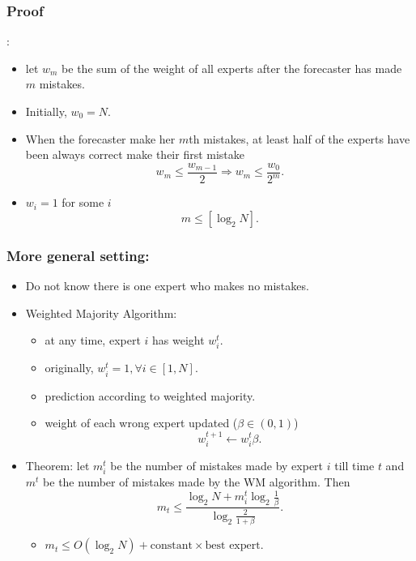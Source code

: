 \documentclass{beamer}
\begin{document}
\begin{frame}
\frametitle{Proof}:
\begin{itemize}
\item let $w_m$ be the sum of the weight of all experts after the forecaster has made $m$ mistakes.
\pause
\item Initially, $w_0 = N.$
\pause
\item When the forecaster make her $m$th mistakes, at least half of the experts have been always correct make their first mistake
\begin{equation*}
w_m \le \frac{w_{m-1}}{2}\Longrightarrow w_m\le \frac{w_0}{2^m}.
\end{equation*} 
\pause
\item $w_i =1$  for some $i$
\begin{equation*}
m\le [\log_2 N].
\end{equation*}
\end{itemize}


\end{frame}
\begin{frame}
\frametitle{More general setting:}
\begin{itemize}
\item Do not know there is one expert who makes no mistakes. 
\pause
\item Weighted Majority Algorithm:
\begin{itemize}
	\item at any time, expert $i$ has weight $w_i^t$.
	\item originally, $w_i^t = 1, \forall i\in[1,N]$.
	\item prediction according to weighted majority. 
	\item weight of each wrong expert updated ($\beta\in(0,1)$)
	$$w_i^{t+1}\leftarrow w_i^t\beta.$$
\end{itemize}
\pause
\item Theorem: let $m_i^t$ be the number of mistakes made by expert $i$ till time $t$ and $m^t$ be the number of mistakes made by the WM algorithm. Then
$$m_t \le \frac{\log_2 N+m_i^t\log_2\frac{1}{\beta}}{\log_2 \frac{2}{1+\beta}}.$$
\begin{itemize}
\item $m_t\le O(\log_2 N)+\text{constant}\times\text{best expert}$.
\end{itemize}

\end{itemize}
\end{frame}
\end{document}
